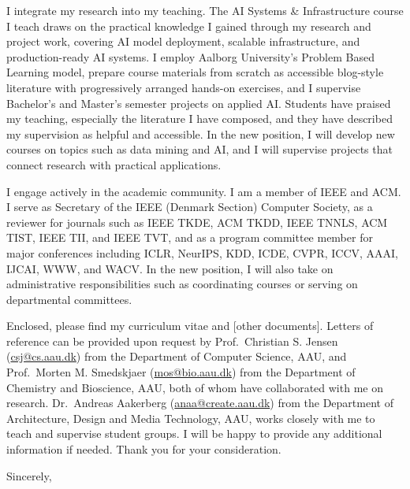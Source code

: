 \documentclass[a4paper]{article}
\begin{document}
\vspace{\entryskip}
I integrate my research into my teaching.
The AI Systems \& Infrastructure course I teach draws on the practical knowledge I gained through my research and project work, covering AI model deployment, scalable infrastructure, and production-ready AI systems.
I employ Aalborg University's Problem Based Learning model, prepare course materials from scratch as accessible blog-style literature with progressively arranged hands-on exercises, and I supervise Bachelor's and Master's semester projects on applied AI.
Students have praised my teaching, especially the literature I have composed, and they have described my supervision as helpful and accessible.
In the new position, I will develop new courses on topics such as data mining and AI, and I will supervise projects that connect research with practical applications.

\vspace{\entryskip}
I engage actively in the academic community.
I am a member of IEEE and ACM.
I serve as Secretary of the IEEE (Denmark Section) Computer Society, as a reviewer for journals such as IEEE TKDE, ACM TKDD, IEEE TNNLS, ACM TIST, IEEE TII, and IEEE TVT, and as a program committee member for major conferences including ICLR, NeurIPS, KDD, ICDE, CVPR, ICCV, AAAI, IJCAI, WWW, and WACV.
In the new position, I will also take on administrative responsibilities such as coordinating courses or serving on departmental committees.

\vspace{\entryskip}
Enclosed, please find my curriculum vitae and [other documents].
Letters of reference can be provided upon request by Prof.~Christian S. Jensen (\href{mailto:csj@cs.aau.dk}{csj@cs.aau.dk}) from the Department of Computer Science, AAU, and Prof.~Morten M. Smedskjaer (\href{mailto:mos@bio.aau.dk}{mos@bio.aau.dk}) from the Department of Chemistry and Bioscience, AAU, both of whom have collaborated with me on research.
Dr.~Andreas Aakerberg (\href{mailto:anaa@create.aau.dk}{anaa@create.aau.dk}) from the Department of Architecture, Design and Media Technology, AAU, works closely with me to teach and supervise student groups.
I will be happy to provide any additional information if needed.
Thank you for your consideration.

\vspace{\entryskip}
Sincerely,

\vspace{\entryskip}
\myname
\end{document}
